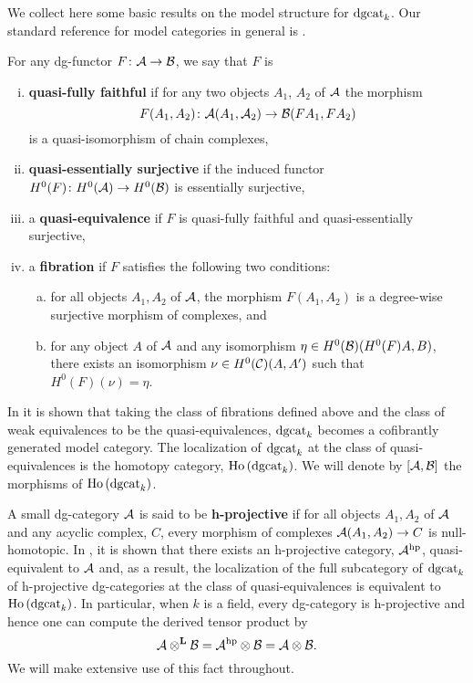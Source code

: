 We collect here some basic results on the model structure for \(\operatorname{dgcat}_k\).
Our standard reference for model categories in general is \textcite{Hovey99}.

For any dg-functor \(F \colon \mathcal{A} \to \mathcal{B}\), we say that \(F\) is
\begin{enumerate}[(i)]
\item
  \textbf{quasi-fully faithful} if for any two objects \(A_1\), \(A_2\) of \(\mathcal{A}\) the morphism
  \[F(A_1, A_2) \colon \mathcal{A}(A_1, \mathcal{A}_2) \to \mathcal{B}(FA_1, FA_2)\]
  is a quasi-isomorphism of chain complexes,
\item
  \textbf{quasi-essentially surjective} if the induced functor \(H^0(F) \colon H^0(\mathcal{A}) \to H^0(\mathcal{B})\) is essentially surjective,
\item
  a \textbf{quasi-equivalence} if \(F\) is quasi-fully faithful and quasi-essentially surjective,
\item
  a \textbf{fibration} if \(F\) satisfies the following two conditions:
  \begin{enumerate}[(a)]
  \item
    for all objects \(A_1, A_2\) of \(\mathcal{A}\), the morphism \(F(A_1,A_2)\) is a degree-wise surjective morphism of complexes, and
  \item
    for any object \(A\) of \(\mathcal{A}\) and any isomorphism \(\eta \in H^0(\mathcal{B})(H^0(F)A, B)\), there exists an isomorphism \(\nu \in H^0(\mathcal{C})(A,A^\prime)\) such that \(H^0(F)(\nu) = \eta\).
  \end{enumerate}
\end{enumerate}
In \textcite{Tabuada05} it is shown that taking the class of fibrations defined above and the class of weak equivalences to be the quasi-equivalences, \(\operatorname{dgcat}_k\) becomes a cofibrantly generated model category.
The localization of \(\operatorname{dgcat}_k\) at the class of quasi-equivalences is the homotopy category, \(\operatorname{Ho}\left(\operatorname{dgcat}_k\right)\).
We will denote by \([\mathcal{A},\mathcal{B}]\) the morphisms of \(\operatorname{Ho}\left(\operatorname{dgcat}_k\right)\).

A small dg-category \(\mathcal{A}\) is said to be \textbf{h-projective} if for all objects \(A_1, A_2\) of \(\mathcal{A}\) and any acyclic complex, \(C\), every morphism of complexes \(\mathcal{A}(A_1, A_2) \to C\) is null-homotopic.
In \textcite{CS15}, it is shown that there exists an h-projective category, \(\mathcal{A}^{\operatorname{hp}}\), quasi-equivalent to \(\mathcal{A}\) and, as a result, the localization of the full subcategory of \(\operatorname{dgcat}_k\) of h-projective dg-categories at the class of quasi-equivalences is equivalent to \(\operatorname{Ho}\left(\operatorname{dgcat}_k\right)\).
In particular, when \(k\) is a field, every dg-category is h-projective and hence one can compute the derived tensor product by
\[\mathcal{A} \otimes^\mathbf{L} \mathcal{B} = \mathcal{A}^{\operatorname{hp}} \otimes \mathcal{B} = \mathcal{A} \otimes \mathcal{B}.\]
We will make extensive use of this fact throughout.
